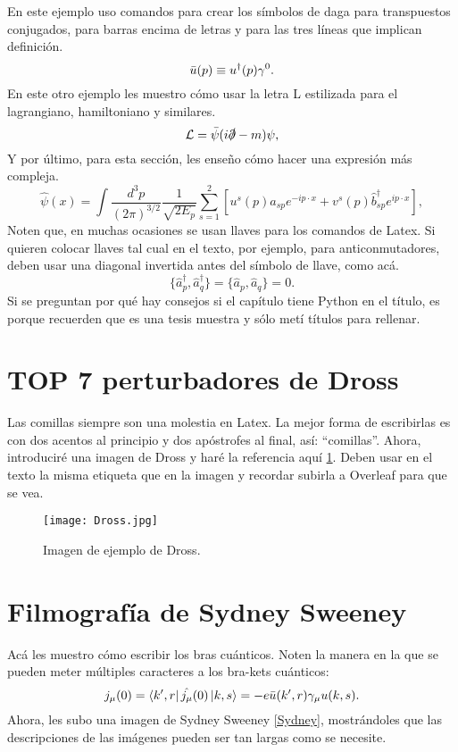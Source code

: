 \documentclass[letter,twoside,12pt]{book}
\begin{document}
En este ejemplo uso comandos para crear los símbolos de daga para transpuestos conjugados, para barras encima de letras y para las tres líneas que implican definición.
\begin{equation}
     \Bar{u}(p) \equiv u^{\dagger}(p)\gamma^0.
\end{equation}
En este otro ejemplo les muestro cómo usar la letra L estilizada para el lagrangiano, hamiltoniano y similares.
\begin{equation}
    \mathcal{L}=\Bar{\psi}(i\slashed \partial-m)\psi, \label{L}
\end{equation}
Y por último, para esta sección, les enseño cómo hacer una expresión más compleja.
\begin{equation}
    \hat{\psi}(x)=\int \frac{d^3p}{(2\pi)^{3/2}}\frac{1}{\sqrt{2E_p}}
    \sum_{s=1}^2 \left[u^s(p)\hat{a}_{sp}e^{-ip\cdot x}+
    v^s(p)\hat{b}^{\dagger}_{sp}e^{ip\cdot x}\right],
\end{equation}
Noten que, en muchas ocasiones se usan llaves para los comandos de Latex. Si quieren colocar llaves tal cual en el texto, por ejemplo, para anticonmutadores, deben usar una diagonal invertida antes del símbolo de llave, como acá.
\begin{equation}
     \{\hat{a}_p^{\dagger},\hat{a}_q^{\dagger}\}= \{\hat{a}_p,\hat{a}_q\}=0.
\end{equation}
Si se preguntan por qué hay consejos si el capítulo tiene Python en el título, es porque recuerden que es una tesis muestra y sólo metí títulos para rellenar.
\section{TOP 7 perturbadores de Dross}\label{sec:dis}
Las comillas siempre son una molestia en Latex. La mejor forma de escribirlas es con dos acentos al principio y dos apóstrofes al final, así: ``comillas''.
Ahora, introduciré una imagen de Dross y haré la referencia aquí \ref{DISfig}. Deben usar en el texto la misma etiqueta que en la imagen y recordar subirla a Overleaf para que se vea.
\begin{figure}[H]
\begin{center}
\texttt{[image: Dross.jpg]}\\
  \caption{\footnotesize Imagen de ejemplo de Dross.}
  \label{DISfig}
\end{center}
\end{figure}

\section{Filmografía de Sydney Sweeney}\label{sec:tens}
Acá les muestro cómo escribir los bras cuánticos. Noten la manera en la que se pueden meter múltiples caracteres a los bra-kets cuánticos:
\begin{equation}
    j_{\mu}(0)=\bra{k',r}\hat{j_{\mu}}(0)\ket{k,s}=-e\Bar{u}(k',r)\gamma_{\mu} u(k,s).
\end{equation}
Ahora, les subo una imagen de Sydney Sweeney \ref{Sydney}, mostrándoles que las descripciones de las imágenes pueden ser tan largas como se necesite.
\end{document}
